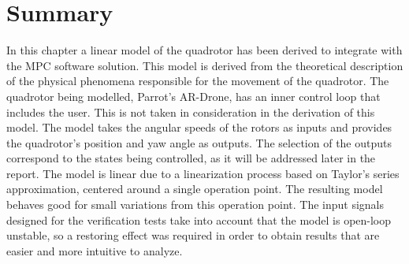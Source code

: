 \newpage
\section{Summary}

In this chapter a linear model of the quadrotor has been derived to integrate with the MPC software solution. This model is derived from the theoretical description of the physical phenomena responsible for the movement of the quadrotor. The quadrotor being modelled, Parrot's AR-Drone, has an inner control loop that includes the user. This is not taken in consideration in the derivation of this model. The model takes the angular speeds of the rotors as inputs and provides the quadrotor's position and yaw angle as outputs. The selection of the outputs correspond to the states being controlled, as it will be addressed later in the report. The model is linear due to a linearization process based on Taylor's series approximation, centered around a single operation point. The resulting model behaves good for small variations from this operation point. The input signals designed for the verification tests take into account that the model is open-loop unstable, so a restoring effect was required in order to obtain results that are easier and more intuitive to analyze. 

